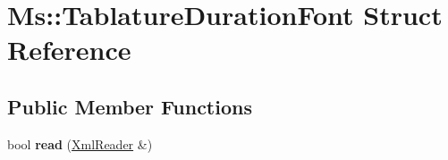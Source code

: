 \hypertarget{struct_ms_1_1_tablature_duration_font}{}\section{Ms\+:\+:Tablature\+Duration\+Font Struct Reference}
\label{struct_ms_1_1_tablature_duration_font}
\subsection*{Public Member Functions}
\begin{DoxyCompactItemize}
\item 
\mbox{\label{struct_ms_1_1_tablature_duration_font_a6d22a4dae216d033193958efe715e4b0}} 
bool {\bfseries read} (\hyperlink{class_ms_1_1_xml_reader}{Xml\+Reader} \&)
\end{DoxyCompactItemize}
